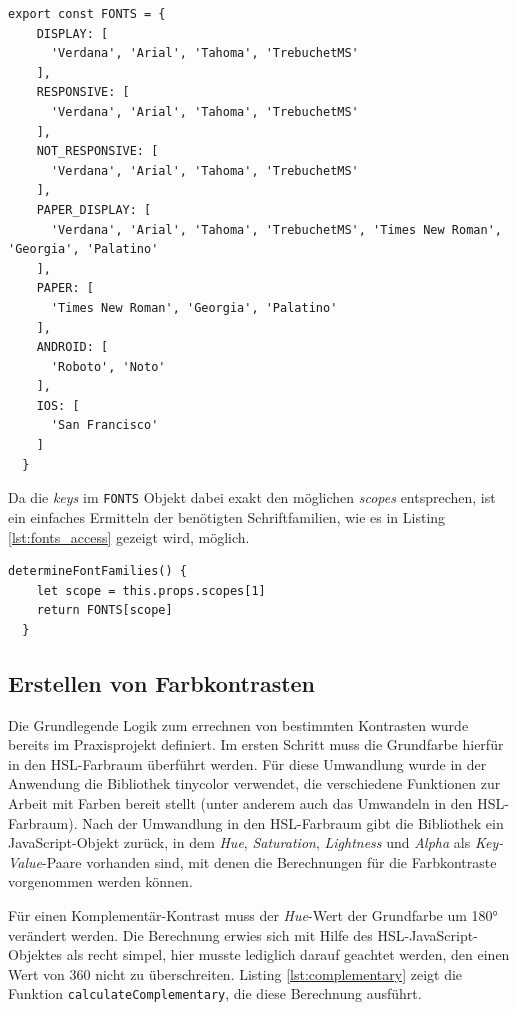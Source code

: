 \begin{lstlisting}[caption=Aufbau des \texttt{FONTS} Objektes, label=lst:fonts_object]
  export const FONTS = {
    DISPLAY: [
      'Verdana', 'Arial', 'Tahoma', 'TrebuchetMS'
    ],
    RESPONSIVE: [
      'Verdana', 'Arial', 'Tahoma', 'TrebuchetMS'
    ],
    NOT_RESPONSIVE: [
      'Verdana', 'Arial', 'Tahoma', 'TrebuchetMS'
    ],
    PAPER_DISPLAY: [
      'Verdana', 'Arial', 'Tahoma', 'TrebuchetMS', 'Times New Roman', 'Georgia', 'Palatino'
    ],
    PAPER: [
      'Times New Roman', 'Georgia', 'Palatino'
    ],
    ANDROID: [
      'Roboto', 'Noto'
    ],
    IOS: [
      'San Francisco'
    ]
  }
\end{lstlisting}

Da die \textit{keys} im \verb|FONTS| Objekt dabei exakt den möglichen \textit{scopes} entsprechen\footnotemark{}, ist ein einfaches Ermitteln der benötigten Schriftfamilien, wie es in Listing \ref{lst:fonts_access} gezeigt wird, möglich.


\begin{lstlisting}[caption=Zugriff auf Werte des \texttt{FONTS} Objektes, label=lst:fonts_access]
  determineFontFamilies() {
    let scope = this.props.scopes[1]
    return FONTS[scope]
  }
\end{lstlisting}

\subsection{Erstellen von Farbkontrasten}
Die Grundlegende Logik zum errechnen von bestimmten Kontrasten wurde bereits im Praxisprojekt definiert. Im ersten Schritt muss die Grundfarbe hierfür in den HSL-Farbraum überführt werden. Für diese Umwandlung wurde in der Anwendung die Bibliothek tinycolor\footnotemark{} verwendet, die verschiedene Funktionen zur Arbeit mit Farben bereit stellt (unter anderem auch das Umwandeln in den HSL-Farbraum).
Nach der Umwandlung in den HSL-Farbraum gibt die Bibliothek ein JavaScript-Objekt zurück, in dem \textit{Hue}, \textit{Saturation}, \textit{Lightness} und \textit{Alpha} als \textit{Key-Value}-Paare vorhanden sind, mit denen die Berechnungen für die Farbkontraste vorgenommen werden können.


Für einen Komplementär-Kontrast muss der \textit{Hue}-Wert der Grundfarbe um 180° verändert werden. Die Berechnung erwies sich mit Hilfe des HSL-JavaScript-Objektes als recht simpel, hier musste lediglich darauf geachtet werden, den einen Wert von 360 nicht zu überschreiten. Listing \ref{lst:complementary} zeigt die Funktion \verb|calculateComplementary|, die diese Berechnung ausführt.

